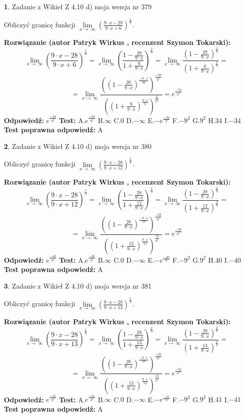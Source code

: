 \documentclass[12pt, a4paper]{article}
\theoremstyle{definition} %
\newtheorem{zad}{}
\newcommand{\zadStart}[1]{\begin{zad}#1\newline}
\newcommand{\zadStop}{\end{zad}}
\newcommand{\rozwStart}[2]{\noindent \textbf{Rozwiązanie (autor #1 , recenzent #2): }\newline}
\newcommand{\rozwStop}{\newline}
\newcommand{\odpStart}{\noindent \textbf{Odpowiedź:}\newline}
\newcommand{\odpStop}{\newline}
\newcommand{\testStart}{\noindent \textbf{Test:}\newline}
\newcommand{\testStop}{\newline}
\newcommand{\kluczStart}{\noindent \textbf{Test poprawna odpowiedź:}\newline}
\newcommand{\kluczStop}{\newline}
\begin{document}
\zadStart{Zadanie z Wikieł Z 4.10 d) moja wersja nr 379}


Obliczyć granicę funkcji  $\lim\limits_{x\to\ \infty}(\frac{9\cdot x-28}{9\cdot x+6})^{\frac{x}{9}}$.
\zadStop
\rozwStart{Patryk Wirkus}{Szymon Tokarski}
$$\lim\limits_{x\to\ \infty}(\frac{9\cdot x-28}{9\cdot x+6})^{\frac{x}{9}} = \lim\limits_{x\to\ \infty}(\frac{1-\frac{28}{9\cdot x}}{1+\frac{6}{9\cdot x}})^{\frac{x}{9}}=\lim\limits_{x\to\ \infty}\frac{(1-\frac{28}{9\cdot x})^{\frac{x}{9}}}{(1+\frac{6}{9\cdot x})^{\frac{x}{9}}}=$$
$$=\lim\limits_{x\to\ \infty}\frac{((1-\frac{28}{9\cdot x})^{\frac{-9\cdot x}{28}})^{\frac{-28}{9^{2}}}}{((1+\frac{6}{9\cdot x})^{\frac{9\cdot x}{6}})^{\frac{6}{9^{2}}}}=e^{\frac{-34}{9^{2}}}$$
\rozwStop
\odpStart
$e^{\frac{-34}{9^{2}}}$
\odpStop
\testStart
A.$e^{\frac{-34}{9^{2}}}$ B.$\infty$ C.$0$ D.$-\infty$ E.$-e^{\frac{-34}{9}}$
F.$-9^{2}$ G.$9^{2}$
H.$34$
I.$-34$
\testStop
\kluczStart
A
\kluczStop



\zadStart{Zadanie z Wikieł Z 4.10 d) moja wersja nr 380}


Obliczyć granicę funkcji  $\lim\limits_{x\to\ \infty}(\frac{9\cdot x-28}{9\cdot x+12})^{\frac{x}{9}}$.
\zadStop
\rozwStart{Patryk Wirkus}{Szymon Tokarski}
$$\lim\limits_{x\to\ \infty}(\frac{9\cdot x-28}{9\cdot x+12})^{\frac{x}{9}} = \lim\limits_{x\to\ \infty}(\frac{1-\frac{28}{9\cdot x}}{1+\frac{12}{9\cdot x}})^{\frac{x}{9}}=\lim\limits_{x\to\ \infty}\frac{(1-\frac{28}{9\cdot x})^{\frac{x}{9}}}{(1+\frac{12}{9\cdot x})^{\frac{x}{9}}}=$$
$$=\lim\limits_{x\to\ \infty}\frac{((1-\frac{28}{9\cdot x})^{\frac{-9\cdot x}{28}})^{\frac{-28}{9^{2}}}}{((1+\frac{12}{9\cdot x})^{\frac{9\cdot x}{12}})^{\frac{12}{9^{2}}}}=e^{\frac{-40}{9^{2}}}$$
\rozwStop
\odpStart
$e^{\frac{-40}{9^{2}}}$
\odpStop
\testStart
A.$e^{\frac{-40}{9^{2}}}$ B.$\infty$ C.$0$ D.$-\infty$ E.$-e^{\frac{-40}{9}}$
F.$-9^{2}$ G.$9^{2}$
H.$40$
I.$-40$
\testStop
\kluczStart
A
\kluczStop



\zadStart{Zadanie z Wikieł Z 4.10 d) moja wersja nr 381}


Obliczyć granicę funkcji  $\lim\limits_{x\to\ \infty}(\frac{9\cdot x-28}{9\cdot x+13})^{\frac{x}{9}}$.
\zadStop
\rozwStart{Patryk Wirkus}{Szymon Tokarski}
$$\lim\limits_{x\to\ \infty}(\frac{9\cdot x-28}{9\cdot x+13})^{\frac{x}{9}} = \lim\limits_{x\to\ \infty}(\frac{1-\frac{28}{9\cdot x}}{1+\frac{13}{9\cdot x}})^{\frac{x}{9}}=\lim\limits_{x\to\ \infty}\frac{(1-\frac{28}{9\cdot x})^{\frac{x}{9}}}{(1+\frac{13}{9\cdot x})^{\frac{x}{9}}}=$$
$$=\lim\limits_{x\to\ \infty}\frac{((1-\frac{28}{9\cdot x})^{\frac{-9\cdot x}{28}})^{\frac{-28}{9^{2}}}}{((1+\frac{13}{9\cdot x})^{\frac{9\cdot x}{13}})^{\frac{13}{9^{2}}}}=e^{\frac{-41}{9^{2}}}$$
\rozwStop
\odpStart
$e^{\frac{-41}{9^{2}}}$
\odpStop
\testStart
A.$e^{\frac{-41}{9^{2}}}$ B.$\infty$ C.$0$ D.$-\infty$ E.$-e^{\frac{-41}{9}}$
F.$-9^{2}$ G.$9^{2}$
H.$41$
I.$-41$
\testStop
\kluczStart
A
\kluczStop
\end{document}
